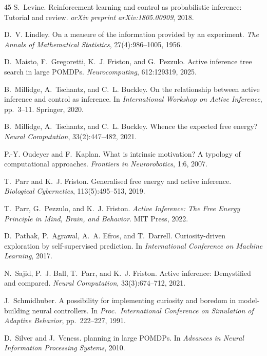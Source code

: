 \documentclass[runningheads]{llncs}
\begin{document}
\begin{thebibliography}{45}
S.~Levine.
\newblock Reinforcement learning and control as probabilistic inference: Tutorial and review.
\newblock \emph{arXiv preprint arXiv:1805.00909}, 2018.

D.~V. Lindley.
\newblock On a measure of the information provided by an experiment.
\newblock \emph{The Annals of Mathematical Statistics}, 27(4):986--1005, 1956.

D.~Maisto, F.~Gregoretti, K.~J. Friston, and G.~Pezzulo.
\newblock Active inference tree search in large {POMDP}s.
\newblock \emph{Neurocomputing}, 612:129319, 2025.

B.~Millidge, A.~Tschantz, and C.~L. Buckley.
\newblock On the relationship between active inference and control as inference.
\newblock In \emph{International Workshop on Active Inference}, pp.\ 3--11. Springer, 2020.

B.~Millidge, A.~Tschantz, and C.~L. Buckley.
\newblock Whence the expected free energy?
\newblock \emph{Neural Computation}, 33(2):447--482, 2021.

P.-Y. Oudeyer and F.~Kaplan.
\newblock What is intrinsic motivation? {A} typology of computational approaches.
\newblock \emph{Frontiers in Neurorobotics}, 1:6, 2007.

T.~Parr and K.~J. Friston.
\newblock Generalised free energy and active inference.
\newblock \emph{Biological Cybernetics}, 113(5):495--513, 2019.

T.~Parr, G.~Pezzulo, and K.~J. Friston.
\newblock \emph{Active Inference: The Free Energy Principle in Mind, Brain, and Behavior}.
\newblock MIT Press, 2022.

D.~Pathak, P.~Agrawal, A.~A. Efros, and T.~Darrell.
\newblock Curiosity-driven exploration by self-supervised prediction.
\newblock In \emph{International Conference on Machine Learning}, 2017.

N.~Sajid, P.~J. Ball, T.~Parr, and K.~J. Friston.
\newblock Active inference: Demystified and compared.
\newblock \emph{Neural Computation}, 33(3):674--712, 2021.

J.~Schmidhuber.
\newblock A possibility for implementing curiosity and boredom in model-building neural controllers.
\newblock In \emph{Proc.\ International Conference on Simulation of Adaptive Behavior}, pp.\ 222--227, 1991.

D.~Silver and J.~Veness.
 planning in large {POMDP}s.
\newblock In \emph{Advances in Neural Information Processing Systems}, 2010.


\end{thebibliography}
\end{document}
